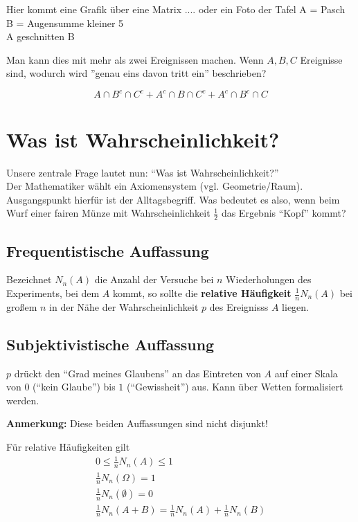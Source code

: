 Hier kommt eine Grafik über eine Matrix .... oder ein Foto der Tafel
A = Pasch\\
B = Augensumme kleiner 5\\
A geschnitten B

Man kann dies mit mehr als zwei Ereignissen machen.
Wenn $A,B,C$ Ereignisse sind, wodurch wird ''genau eins davon tritt ein'' beschrieben?

\begin{equation}
A \cap B^c \cap C^c + A^c \cap  B \cap C^c + A^c \cap B^c \cap C
\end{equation}

\section{Was ist Wahrscheinlichkeit?}

Unsere zentrale Frage lautet nun: ``Was ist Wahrscheinlichkeit?''\\
Der Mathematiker wählt ein Axiomensystem (vgl. Geometrie/Raum).
Ausgangspunkt hierfür ist der Alltagsbegriff.
Was bedeutet es also, wenn beim Wurf einer fairen Münze mit Wahrscheinlichkeit $\frac{1}{2}$ das Ergebnis ``Kopf'' kommt?\\

\subsection{Frequentistische Auffassung}

Bezeichnet $N_n(A)$ die Anzahl der Versuche bei $n$ Wiederholungen des Experiments, bei dem $A$ kommt, so sollte die \textbf{relative Häufigkeit} $\frac{1}{n} N_n(A)$ bei großem $n$ in der Nähe der Wahrscheinlichkeit $p$ des Ereignisss $A$ liegen.

\subsection{Subjektivistische Auffassung}

$p$ drückt den ``Grad meines Glaubens'' an das Eintreten von $A$ auf einer Skala von $0$ (``kein Glaube'') bis $1$ (``Gewissheit'') aus.
Kann über Wetten formalisiert werden.

\noindent \textbf{Anmerkung:} Diese beiden Auffassungen sind nicht disjunkt!

Für relative Häufigkeiten gilt
\begin{eqnarray*}
0 \leq \frac{1}{n} N_n(A) \leq 1 \\
\frac{1}{n} N_n(\Omega) = 1 \\
\frac{1}{n} N_n(\emptyset) = 0\\
\frac{1}{n} N_n(A+B) = \frac{1}{n} N_n(A) + \frac{1}{n} N_n(B)
\end{eqnarray*}

